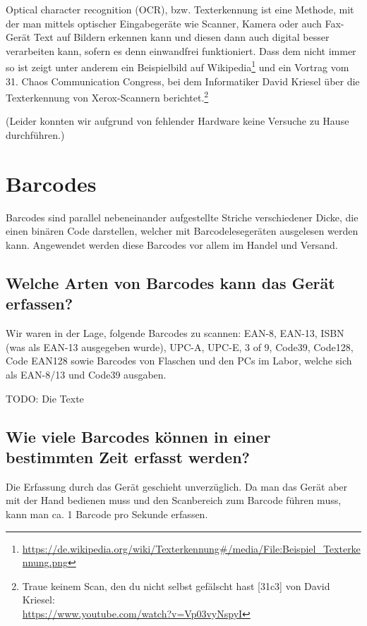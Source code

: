 \documentclass[a4paper,12pt,headsepline,footsepline]{scrartcl}
\begin{document}
\begin{titlepage}
Optical character recognition (OCR), bzw. Texterkennung ist eine Methode, mit der man mittels optischer
Eingabegeräte wie Scanner, Kamera oder auch Fax-Gerät Text auf Bildern erkennen kann und diesen dann auch
digital besser verarbeiten kann, sofern es denn einwandfrei funktioniert. Dass dem nicht immer so ist zeigt
unter anderem ein Beispielbild auf Wikipedia\footnote{\url{https://de.wikipedia.org/wiki/Texterkennung\#/media/File:Beispiel_Texterkennung.png}}
und ein Vortrag vom 31. Chaos Communication Congress, bei dem Informatiker David Kriesel über die Texterkennung
von Xerox-Scannern berichtet.\footnote{Traue keinem Scan, den du nicht selbst gefälscht hast [31c3] von David Kriesel:\\ \url{https://www.youtube.com/watch?v=Vp03vyNspyI}}

(Leider konnten wir aufgrund von fehlender Hardware keine Versuche zu Hause durchführen.)

\end{titlepage}

\section{Barcodes}

Barcodes sind parallel nebeneinander aufgestellte Striche verschiedener Dicke, die einen binären Code darstellen,
welcher mit Barcodelesegeräten ausgelesen werden kann. Angewendet werden diese Barcodes vor allem im Handel und Versand.

\subsection{Welche Arten von Barcodes kann das Gerät erfassen?}

Wir waren in der Lage, folgende Barcodes zu scannen: EAN-8, EAN-13, ISBN (was als EAN-13 ausgegeben wurde), 
UPC-A, UPC-E, 3 of 9, Code39, Code128, Code EAN128 sowie Barcodes von Flaschen und den PCs im Labor, welche
sich als EAN-8/13 und Code39 ausgaben.

TODO: Die Texte

\subsection{Wie viele Barcodes können in einer bestimmten Zeit erfasst werden?}

Die Erfassung durch das Gerät geschieht unverzüglich. Da man das Gerät aber mit der Hand bedienen muss und den
Scanbereich zum Barcode führen muss, kann man ca. 1 Barcode pro Sekunde erfassen.
\end{document}
